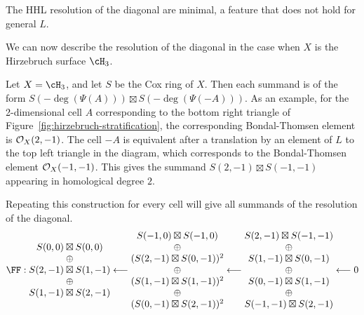 \documentclass{amsart}
\begin{document}
\begin{remark}
 The HHL resolution of the diagonal are  minimal, a feature that does not hold for general $L$.
\end{remark}


We can now describe the resolution of the diagonal in the case when $X$ is the  Hirzebruch surface $\cH_{3}$. 
\begin{example}
  Let $X=\cH_3$, and let $S$ be the Cox ring of $X$. Then each summand is of the form $S(-\deg(\Psi(A)))\boxtimes S(-\deg(\Psi(-A)))$. As an example, for the 2-dimensional cell $A$ corresponding to the bottom right triangle of Figure~\ref{fig:hirzebruch-stratification}, the corresponding Bondal-Thomsen element is ${\mathcal O}_X(2,-1)$. The cell $-A$ is equivalent after a translation by an element of $L$ to the top left triangle in the diagram, which corresponds to the Bondal-Thomsen element ${\mathcal O}_X(-1,-1)$. This gives the summand $S(2,-1)\boxtimes S(-1,-1)$ appearing in homological degree $2$. 

  Repeating this construction for every cell will give all summands of the resolution of the diagonal.
  \[
   \FF : \begin{matrix}
    S(0,0)\boxtimes S(0,0)\\
    \oplus\\
    S(2,-1)\boxtimes S(1,-1)\\
    \oplus\\
    S(1,-1)\boxtimes S(2,-1)\\
  \end{matrix}\longleftarrow
  \begin{matrix}
    S(-1,0)\boxtimes S(-1,0)\\
    \oplus\\
    (S(2,-1)\boxtimes S(0,-1))^2\\
    \oplus\\
    (S(1,-1)\boxtimes S(1,-1))^2\\
    \oplus\\
    (S(0,-1)\boxtimes S(2,-1))^2\\
  \end{matrix}
  \longleftarrow
  \begin{matrix}
    S(2,-1)\boxtimes S(-1,-1)\\
    \oplus\\
    S(1,-1)\boxtimes S(0,-1)\\
    \oplus\\
    S(0,-1)\boxtimes S(1,-1)\\
    \oplus\\
    S(-1,-1)\boxtimes S(2,-1)\\
  \end{matrix}
  \longleftarrow 0
  \]
\end{example}
\end{document}
